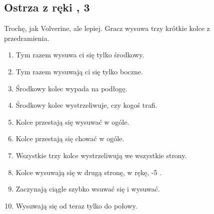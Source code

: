 \subsection{Ostrza z ręki \abh{}, 3 \abnkp{}}
Trochę, jak Volverine, ale lepiej.
Gracz wysuwa trzy krótkie kolce z przedramienia.
\begin{enumerate}
	\item Tym razem wysuwa ci się tylko środkowy.
	\item Tym razem wysuwają ci się tylko boczne.
	\item Środkowy kolec wypada na podłogę.
	\item Środkowy kolec wystrzeliwuje, \dii{} czy kogoś trafi.
	\item Kolce przestają się wysuwać w ogóle.
	\item Kolce przestają się chować w ogóle.
	\item Wszystkie trzy kolce wystrzeliwują we wszystkie strony.
	\item Kolce wysuwają się w drugą stronę, w rękę, -5 \abzyc{}.
	\item Zaczynają ciągle szybko wsuwać się i wysuwać.
	\item Wysuwają się od teraz tylko do połowy.
\end{enumerate}









